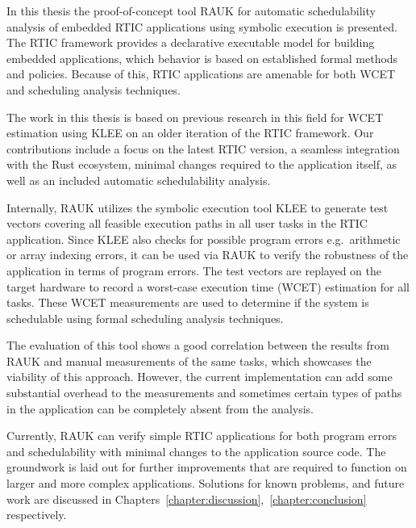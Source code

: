 In this thesis the proof-of-concept tool RAUK for automatic schedulability
analysis of embedded RTIC applications using symbolic execution is presented.
The RTIC framework provides a declarative executable model for building
embedded applications, which behavior is based on established formal methods
and policies. Because of this, RTIC applications are amenable for both WCET and
scheduling analysis techniques.

The work in this thesis is based on previous research in this field for WCET
estimation using KLEE on an older iteration of the RTIC framework. Our
contributions include a focus on the latest RTIC version, a seamless
integration with the Rust ecosystem, minimal changes required to the
application itself, as well as an included automatic schedulability analysis.

Internally, RAUK utilizes the symbolic execution tool KLEE to generate test vectors
covering all feasible execution paths in all user tasks in the RTIC
application. Since KLEE also checks for possible program errors e.g.\ arithmetic or
array indexing errors, it can be used via RAUK to verify the robustness of the
application in terms of program errors. The test vectors are replayed on the
target hardware to record a worst-case execution time (WCET) estimation for all
tasks. These WCET measurements are used to determine if the system is
schedulable using formal scheduling analysis techniques.

The evaluation of this tool shows a good correlation between the results from
RAUK and manual measurements of the same tasks, which showcases the viability
of this approach. However, the current implementation can add some substantial
overhead to the measurements and sometimes certain types of paths in the
application can be completely absent from the analysis.

Currently, RAUK can verify simple RTIC applications for both program errors and
schedulability with minimal changes to the application source code. The
groundwork is laid out for further improvements that are required to function
on larger and more complex applications. Solutions for known problems, and future work
are discussed in Chapters~\ref{chapter:discussion},~\ref{chapter:conclusion} respectively.
